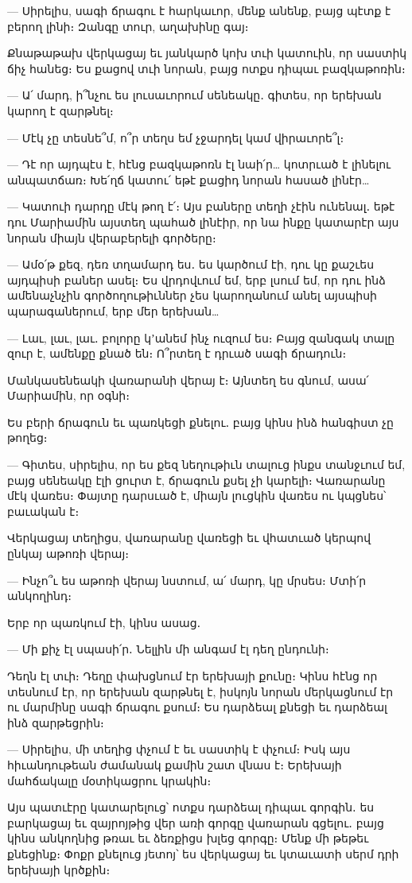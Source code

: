 — Սիրելիս, սագի ճրագու է հարկաւոր, մենք անենք, բայց պէտք է բերող լինի։ Զանգը տուր, աղախինը գայ։

Քնաթաթախ վերկացայ եւ յանկարծ կոխ տւի կատուին, որ սաստիկ ճիչ հանեց։ Ես քացով տւի նորան, բայց ոտքս դիպաւ բազկաթոռին։

— Ա՛ մարդ, ի՞նչու ես լուսաւորում սենեակը․ գիտես, որ երեխան կարող է զարթնել։

— Մէկ չը տեսնե՞մ, ո՞ր տեղս եմ չջարդել կամ վիրաւորե՞լ։

— Դէ որ այդպէս է, հէնց բազկաթոռն էլ նաի՛ր… կոտրւած է լինելու անպատճառ։ Խե՛ղճ կատու՛ եթէ քացիդ նորան հասած լինէր…

— Կատուի դարդը մէկ թող է՛։ Այս բաները տեղի չէին ունենալ․ եթէ դու Մարիամին այստեղ պահած լինէիր, որ նա ինքը կատարէր այս նորան միայն վերաբերելի գործերը։

— Ամօ՛թ քեզ, դեռ տղամարդ ես․ ես կարծում էի, դու կը քաշւես այդպիսի բաներ ասել։ Ես վրդովւում եմ, երբ լսում եմ, որ դու ինձ ամենաչնչին գործողութիւններ չես կարողանում անել այսպիսի պարագաներում, երբ մեր երեխան…

— Լաւ, լաւ, լաւ․ բոլորը կʼանեմ ինչ ուզում ես։ Բայց զանգակ տալը զուր է, ամենքը քնած են։ Ո՞րտեղ է դրւած սագի ճրադուն։

Մանկասենեակի վառարանի վերայ է։ Այնտեղ ես գնում, ասա՛ Մարիամին, որ օգնի։

Ես բերի ճրագուն եւ պառկեցի քնելու․ բայց կինս ինձ հանգիստ չը թողեց։

— Գիտես, սիրելիս, որ ես քեզ նեղութիւն տալուց ինքս տանջւում եմ, բայց սենեակը էլի ցուրտ է, ճրագուն քսել չի կարելի։ Վառարանը մէկ վառես։ Փայտը դարսւած է, միայն լուցկին վառես ու կպցնես՝ բաւական է։

Վերկացայ տեղիցս, վառարանը վառեցի եւ վհատւած կերպով ընկայ աթոռի վերայ։

— Ինչո՞ւ ես աթոռի վերայ նստում, ա՛ մարդ, կը մրսես։ Մտի՛ր անկողինդ։

Երբ որ պառկում էի, կինս ասաց․

— Մի քիչ էլ սպասի՛ր․ Նելլին մի անգամ էլ դեղ ընդունի։

Դեղն էլ տւի։ Դեղը փախցնում էր երեխայի քունը։ Կինս հէնց որ տեսնում էր, որ երեխան զարթնել է, իսկոյն նորան մերկացնում էր ու մարմինը սագի ճրագու քսում։ Ես դարձեալ քնեցի եւ դարձեալ ինձ զարթեցրին։

— Սիրելիս, մի տեղից փչում է եւ սաստիկ է փչում։ Իսկ այս հիւանդութեան ժամանակ քամին շատ վնաս է։ Երեխայի մահճակալը մօտիկացրու կրակին։

Այս պատւէրը կատարելուց՝ ոտքս դարձեալ դիպաւ գորգին․ ես բարկացայ եւ զայրոյթից վեր առի գորգը վառարան գցելու․ բայց կինս անկողնից թռաւ եւ ձեռքիցս խլեց գորգը։ Մենք մի թեթեւ քնեցինք։ Փոքր քնելուց յետոյ՝ ես վերկացայ եւ կտաւատի սերմ դրի երեխայի կրծքին։


